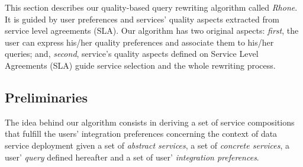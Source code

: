 This section describes our quality-based query rewriting algorithm called \textit{Rhone}. It is guided by user preferences and services' quality aspects extracted from service level agreements (SLA). Our algorithm has two original aspects: \textit{first}, the user can express his/her quality preferences and associate them to his/her queries; and, \textit{second},  service's quality aspects defined on Service Level Agreements (SLA) guide service selection and  the whole rewriting process. %
%

\subsection{Preliminaries}

The idea behind our algorithm consists in deriving a set of service compositions that fulfill the users' integration preferences concerning the context of data service deployment given a set of \textit{abstract services}, a set of \textit{concrete services}, a user' \textit{query} defined hereafter and a set of user' \textit{integration preferences}.
%
%
